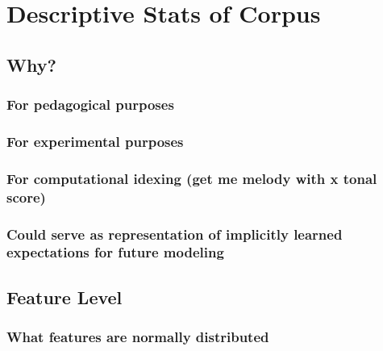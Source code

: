 \documentclass[]{book}
\theoremstyle{definition}
\theoremstyle{definition}
\theoremstyle{definition}
\theoremstyle{remark}
\begin{document}
\hypertarget{descriptive-stats-of-corpus}{%
\section{Descriptive Stats of
Corpus}\label{descriptive-stats-of-corpus}}

\hypertarget{why-1}{%
\subsection{Why?}\label{why-1}}

\hypertarget{for-pedagogical-purposes}{%
\subsubsection{For pedagogical
purposes}\label{for-pedagogical-purposes}}

\hypertarget{for-experimental-purposes}{%
\subsubsection{For experimental
purposes}\label{for-experimental-purposes}}

\hypertarget{for-computational-idexing-get-me-melody-with-x-tonal-score}{%
\subsubsection{For computational idexing (get me melody with x tonal
score)}\label{for-computational-idexing-get-me-melody-with-x-tonal-score}}

\hypertarget{could-serve-as-representation-of-implicitly-learned-expectations-for-future-modeling}{%
\subsubsection{Could serve as representation of implicitly learned
expectations for future
modeling}\label{could-serve-as-representation-of-implicitly-learned-expectations-for-future-modeling}}

\hypertarget{feature-level}{%
\subsection{Feature Level}\label{feature-level}}

\hypertarget{what-features-are-normally-distributed}{%
\subsubsection{What features are normally
distributed}\label{what-features-are-normally-distributed}}
\end{document}
